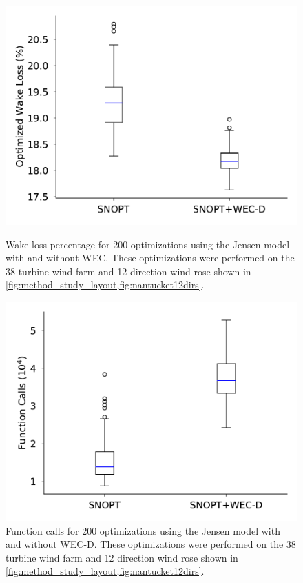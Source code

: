 \documentclass[a4paper]{jpconf}
\begin{document}
\begin{figure}[h!]  
	\centering
	\begin{minipage}[t]{18pc}    
		\centering
		\includegraphics[width=\textwidth, trim={0cm 0cm 0cm 0cm}]{final_images/results/38turbs_results_jensen_percent_wake_loss.pdf}
		\caption{Wake loss percentage for 200 optimizations using the Jensen model with and without WEC. These optimizations were performed on the 38 turbine wind farm and 12 direction wind rose shown in \cref{fig:method_study_layout,fig:nantucket12dirs}.}
		\label{fig:jensen-38-wake-loss}
	\end{minipage}\hspace{1pc}
	\begin{minipage}[t]{18pc}    
		\centering
		\includegraphics[width=\textwidth, trim={0cm 0cm 0cm 0cm}]{final_images/results/38turbs_results_jensen_fcalls.pdf}
		\caption{Function calls for 200 optimizations using the Jensen model with and without WEC-D. These optimizations were performed on the 38 turbine wind farm and 12 direction wind rose shown in \cref{fig:method_study_layout,fig:nantucket12dirs}.}
		\label{fig:jensen-38-wake-fcalls}
	\end{minipage}
\end{figure}
\end{document}
